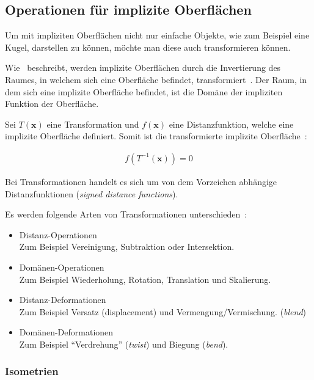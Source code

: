 \subsection{Operationen für implizite Oberflächen}
\label{subsec:implicit_surfaces_ops}

Um mit impliziten Oberflächen nicht nur einfache Objekte, wie zum Beispiel eine
Kugel, darstellen zu können, möchte man diese auch transformieren können.

Wie~\citeauthor{hart_sphere_1994} beschreibt, werden implizite
Oberflächen durch die Invertierung des Raumes, in welchem sich eine
Oberfläche befindet, transformiert~\parencite[S. 543]{hart_sphere_1994}.
Der Raum, in dem sich eine implizite Oberfläche befindet, ist die Domäne
der impliziten Funktion der Oberfläche.

Sei $T(\bm{x})$ eine Transformation und $f(\bm{x})$ eine Distanzfunktion,
welche eine implizite Oberfläche definiert. Somit ist die transformierte
implizite Oberfläche~\parencite[S. 534]{hart_sphere_1994}:

\begin{gather}
    f(T^{-1}(\bm{x})) = 0
\end{gather}

Bei Transformationen handelt es sich um von dem Vorzeichen abhängige
Distanzfunktionen (\textit{signed distance functions}).

Es werden folgende Arten von Transformationen
unterschieden~\parencite[S. 14]{hart_ray_1993}:
\begin{itemize}
    \item{Distanz-Operationen}\\
        Zum Beispiel Vereinigung, Subtraktion oder Intersektion.
    \item{Domänen-Operationen}\\
        Zum Beispiel Wiederholung, Rotation, Translation und Skalierung.
    \item{Distanz-Deformationen}\\
        Zum Beispiel Versatz (displacement) und Vermengung/Vermischung.
        (\textit{blend})
    \item{Domänen-Deformationen}\\
        Zum Beispiel ``Verdrehung'' (\textit{twist}) und Biegung
        (\textit{bend}).
\end{itemize}

\subsubsection{Isometrien}
\label{ssubsec:implicit_surfaces_ops_isometries}

